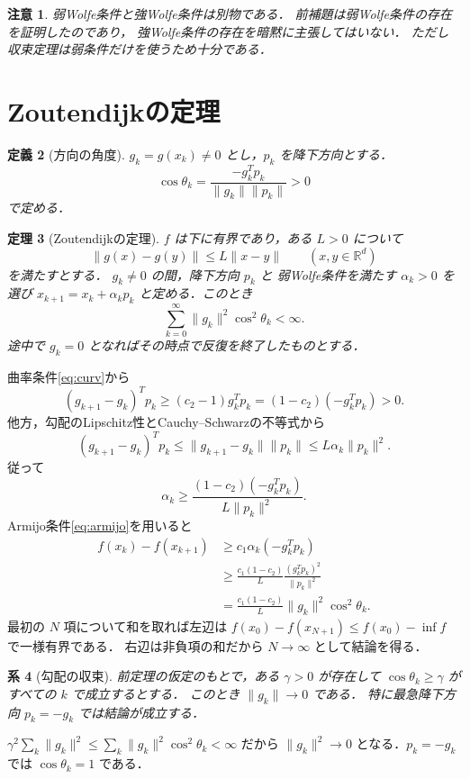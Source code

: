 \documentclass[a5paper,10pt,onecolumn]{jsarticle}
\makeatletter
\theoremstyle{mathnotetheorem}
\newtheorem{theorem}{定理}[section]
\newtheorem{definition}[theorem]{定義}
\newtheorem{corollary}[theorem]{系}
\newtheorem{remark}[theorem]{注意}
\renewcommand{\proofname}{証明}
\renewenvironment{proof}[1][\proofname]{%
  \par\pushQED{\qed}\normalfont\topsep4\p@\@plus2\p@\relax
  \trivlist\item[\hskip\labelsep\bfseries #1]\ignorespaces
}{\popQED\endtrivlist\@endpefalse}
\newcommand{\norm}[1]{\lVert #1\rVert}
\makeatother
\begin{document}
\begin{remark}
弱Wolfe条件と強Wolfe条件は別物である．
前補題は弱Wolfe条件の存在を証明したのであり，
強Wolfe条件の存在を暗黙に主張してはいない．
ただし収束定理は弱条件だけを使うため十分である．
\end{remark}

\section{Zoutendijkの定理}
\begin{definition}[方向の角度]
$g_k=g(x_k)\ne0$ とし，$p_k$ を降下方向とする．
\[
 \cos\theta_k=\frac{-g_k^Tp_k}{\norm{g_k}\norm{p_k}}>0
\]
で定める．
\end{definition}

\begin{theorem}[Zoutendijkの定理]\label{thm:zout}
$f$ は下に有界であり，ある $L>0$ について
\[
 \norm{g(x)-g(y)}\le L\norm{x-y}
 \qquad(x,y\in\mathbb R^d)
\]
を満たすとする．
$g_k\ne0$ の間，降下方向 $p_k$ と
弱Wolfe条件を満たす $\alpha_k>0$ を選び
$x_{k+1}=x_k+\alpha_kp_k$ と定める．このとき
\[
 \sum_{k=0}^{\infty}\norm{g_k}^2\cos^2\theta_k<\infty.
\]
途中で $g_k=0$ となればその時点で反復を終了したものとする．
\end{theorem}
\begin{proof}
曲率条件\eqref{eq:curv}から
\[
 (g_{k+1}-g_k)^Tp_k
 \ge(c_2-1)g_k^Tp_k
 =(1-c_2)(-g_k^Tp_k)>0.
\]
他方，勾配のLipschitz性とCauchy--Schwarzの不等式から
\[
 (g_{k+1}-g_k)^Tp_k
 \le\norm{g_{k+1}-g_k}\norm{p_k}
 \le L\alpha_k\norm{p_k}^2.
\]
従って
\[
 \alpha_k\ge\frac{(1-c_2)(-g_k^Tp_k)}{L\norm{p_k}^2}.
\]
Armijo条件\eqref{eq:armijo}を用いると
\begin{align*}
 f(x_k)-f(x_{k+1})
 &\ge c_1\alpha_k(-g_k^Tp_k)\\
 &\ge\frac{c_1(1-c_2)}{L}
       \frac{(g_k^Tp_k)^2}{\norm{p_k}^2}\\
 &=\frac{c_1(1-c_2)}{L}
           \norm{g_k}^2\cos^2\theta_k.
\end{align*}
最初の $N$ 項について和を取れば左辺は
$f(x_0)-f(x_{N+1})\le f(x_0)-\inf f$ で一様有界である．
右辺は非負項の和だから $N\to\infty$ として結論を得る．
\end{proof}

\begin{corollary}[勾配の収束]\label{cor:grad}
前定理の仮定のもとで，ある $\gamma>0$ が存在して
$\cos\theta_k\ge\gamma$ がすべての $k$ で成立するとする．
このとき $\norm{g_k}\to0$ である．
特に最急降下方向 $p_k=-g_k$ では結論が成立する．
\end{corollary}
\begin{proof}
$\gamma^2\sum_k\norm{g_k}^2\le
\sum_k\norm{g_k}^2\cos^2\theta_k<\infty$ だから
$\norm{g_k}^2\to0$ となる．$p_k=-g_k$ では
$\cos\theta_k=1$ である．
\end{proof}
\end{document}
